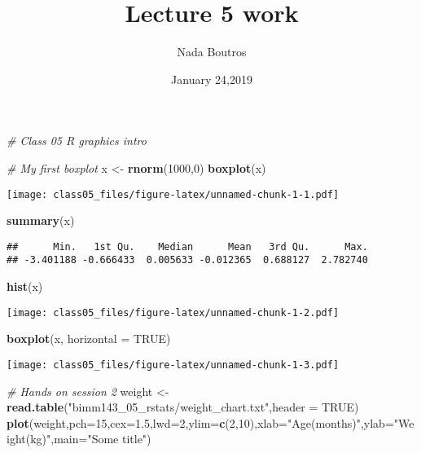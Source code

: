 \documentclass[]{article}
\title{Lecture 5 work}
\author{Nada Boutros}
\date{January 24,2019}
\newenvironment{Shaded}{\begin{snugshade}}{\end{snugshade}}
\newcommand{\KeywordTok}[1]{\textcolor[rgb]{0.13,0.29,0.53}{\textbf{#1}}}
\newcommand{\DataTypeTok}[1]{\textcolor[rgb]{0.13,0.29,0.53}{#1}}
\newcommand{\DecValTok}[1]{\textcolor[rgb]{0.00,0.00,0.81}{#1}}
\newcommand{\FloatTok}[1]{\textcolor[rgb]{0.00,0.00,0.81}{#1}}
\newcommand{\StringTok}[1]{\textcolor[rgb]{0.31,0.60,0.02}{#1}}
\newcommand{\CommentTok}[1]{\textcolor[rgb]{0.56,0.35,0.01}{\textit{#1}}}
\newcommand{\OtherTok}[1]{\textcolor[rgb]{0.56,0.35,0.01}{#1}}
\newcommand{\NormalTok}[1]{#1}
\begin{document}
\maketitle

\begin{Shaded}
\begin{Highlighting}[]
\CommentTok{# Class 05 R graphics intro}

\CommentTok{# My first boxplot}
\NormalTok{x <-}\StringTok{ }\KeywordTok{rnorm}\NormalTok{(}\DecValTok{1000}\NormalTok{,}\DecValTok{0}\NormalTok{)}
\KeywordTok{boxplot}\NormalTok{(x)}
\end{Highlighting}
\end{Shaded}

\texttt{[image: class05\_files/figure-latex/unnamed-chunk-1-1.pdf]}

\begin{Shaded}
\begin{Highlighting}[]
\KeywordTok{summary}\NormalTok{(x)}
\end{Highlighting}
\end{Shaded}

\begin{verbatim}
##      Min.   1st Qu.    Median      Mean   3rd Qu.      Max. 
## -3.401188 -0.666433  0.005633 -0.012365  0.688127  2.782740
\end{verbatim}

\begin{Shaded}
\begin{Highlighting}[]
\KeywordTok{hist}\NormalTok{(x)}
\end{Highlighting}
\end{Shaded}

\texttt{[image: class05\_files/figure-latex/unnamed-chunk-1-2.pdf]}

\begin{Shaded}
\begin{Highlighting}[]
\KeywordTok{boxplot}\NormalTok{(x, }\DataTypeTok{horizontal =} \OtherTok{TRUE}\NormalTok{)}
\end{Highlighting}
\end{Shaded}

\texttt{[image: class05\_files/figure-latex/unnamed-chunk-1-3.pdf]}

\begin{Shaded}
\begin{Highlighting}[]
\CommentTok{# Hands on session 2}
\NormalTok{weight <-}\StringTok{ }\KeywordTok{read.table}\NormalTok{(}\StringTok{"bimm143_05_rstats/weight_chart.txt"}\NormalTok{,}\DataTypeTok{header =} \OtherTok{TRUE}\NormalTok{)}
\KeywordTok{plot}\NormalTok{(weight,}\DataTypeTok{pch=}\DecValTok{15}\NormalTok{,}\DataTypeTok{cex=}\FloatTok{1.5}\NormalTok{,}\DataTypeTok{lwd=}\DecValTok{2}\NormalTok{,}\DataTypeTok{ylim=}\KeywordTok{c}\NormalTok{(}\DecValTok{2}\NormalTok{,}\DecValTok{10}\NormalTok{),}\DataTypeTok{xlab=}\StringTok{"Age(months)"}\NormalTok{,}\DataTypeTok{ylab=}\StringTok{"Weight(kg)"}\NormalTok{,}\DataTypeTok{main=}\StringTok{"Some title"}\NormalTok{)}
\end{Highlighting}
\end{Shaded}
\end{document}
